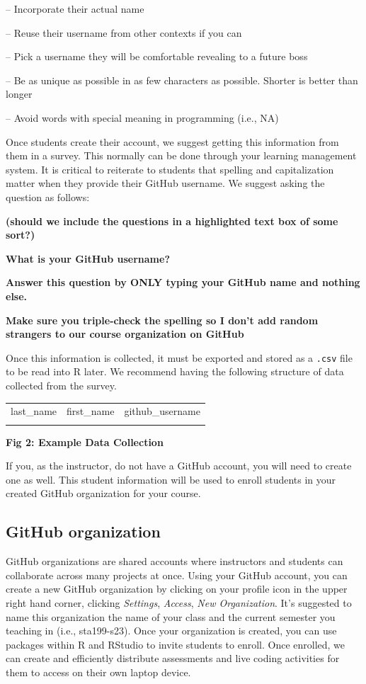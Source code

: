\documentclass[
  12pt]{article}
\begin{document}
-- Incorporate their actual name

-- Reuse their username from other contexts if you can

-- Pick a username they will be comfortable revealing to a future boss

-- Be as unique as possible in as few characters as possible. Shorter is
better than longer

-- Avoid words with special meaning in programming (i.e., NA)

Once students create their account, we suggest getting this information
from them in a survey. This normally can be done through your learning
management system. It is critical to reiterate to students that spelling
and capitalization matter when they provide their GitHub username. We
suggest asking the question as follows:

\textbf{(should we include the questions in a highlighted text box of
some sort?)}

\textbf{What is your GitHub username?}

\textbf{Answer this question by ONLY typing your GitHub name and nothing
else.}

\textbf{Make sure you triple-check the spelling so I don't add random
strangers to our course organization on GitHub}

Once this information is collected, it must be exported and stored as a
\texttt{.csv} file to be read into R later. We recommend having the
following structure of data collected from the survey.

\begin{longtable}[]{@{}lll@{}}
\toprule\noalign{}
\endhead
\bottomrule\noalign{}
\endlastfoot
last\_name & first\_name & github\_username \\
& & \\
\end{longtable}

\textbf{Fig 2: Example Data Collection}

If you, as the instructor, do not have a GitHub account, you will need
to create one as well. This student information will be used to enroll
students in your created GitHub organization for your course.

\hypertarget{github-organization}{%
\subsection{GitHub organization}\label{github-organization}}

GitHub organizations are shared accounts where instructors and students
can collaborate across many projects at once. Using your GitHub account,
you can create a new GitHub organization by clicking on your profile
icon in the upper right hand corner, clicking \emph{Settings},
\emph{Access}, \emph{New Organization}. It's suggested to name this
organization the name of your class and the current semester you
teaching in (i.e., sta199-s23). Once your organization is created, you
can use packages within R and RStudio to invite students to enroll. Once
enrolled, we can create and efficiently distribute assessments and live
coding activities for them to access on their own laptop device.
\end{document}
